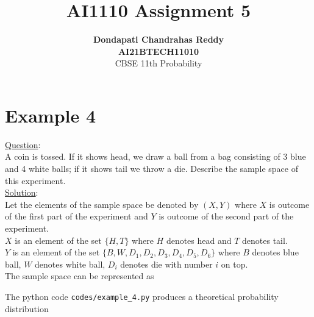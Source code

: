 \documentclass[journal,12pt,twocolumn]{IEEEtran}
\begin{document}
\title{\textbf{AI1110 Assignment 5} }
\author{\textbf{Dondapati Chandrahas Reddy}\\\textbf{AI21BTECH11010}\\ CBSE 11th Probability}
\maketitle

{\section{Example 4}}

{\large \underline{Question}:}\\

A coin is tossed. If it shows head, we draw a ball from a bag consisting of
3 blue and 4 white balls; if it shows tail we throw a die. Describe the sample space of
this experiment.\\

{\large \underline{Solution}:}\\

Let the elements of the sample space be denoted by $(X,Y)$ where $X$ is outcome of the first part of the experiment and $Y$ is outcome of the second part of the experiment.\\

$X$ is an element of the set $\{H,T\}$ where $H$ denotes head and $T$ denotes tail.\\

$Y$ is an element of the set $\{B,W,D_1,D_2,D_3,D_4,D_5,D_6\}$ where $B$ denotes blue ball, $W$ denotes white ball, $D_i$ denotes die with number $i$ on top.\\

The sample space can be represented as 

\begin{table}[h!]
	
\end{table}

The python code \texttt{codes/example\_4.py} produces a theoretical probability distribution
\end{document}
